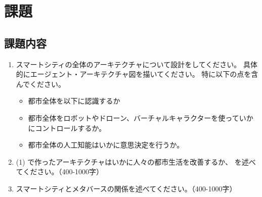 \documentclass{article}[jsarticle]
\begin{document}
\section{課題}
\subsection{課題内容}
\begin{enumerate}
    \item スマートシティの全体のアーキテクチャについて設計をしてください。
    具体的にエージェント・アーキテクチャ図を描いてください。
    特に以下の点を含んでください。
    \begin{itemize}
        \item 都市全体を以下に認識するか
        \item 都市全体をロボットやドローン、バーチャルキャラクターを使っていかにコントロールするか。
        \item 都市全体の人工知能はいかに意思決定を行うか。
    \end{itemize}
    \item (1) で作ったアーキテクチャはいかに人々の都市生活を改善するか、
    を述べてください。（400-1000字）
    \item スマートシティとメタバースの関係を述べてください。（400-1000字）
\end{enumerate}
\end{document}
